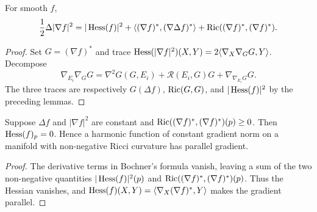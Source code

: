 \begin{lemma}
\label{lem:function-bochner-formula}





For smooth $f$,
$$\frac12\Delta|\nabla f|^2
=|\operatorname{Hess}(f)|^2
+\langle(\nabla f)^*,(\nabla\Delta f)^*\rangle
+\operatorname{Ric}((\nabla f)^*,(\nabla f)^*).$$
\end{lemma}
\begin{proof}
\sketch
{}

Set $G=(\nabla f)^*$ and trace
$\operatorname{Hess}(|\nabla f|^2)(X,Y)=2\langle\nabla_X\nabla_GG,Y\rangle$.
Decompose
$$\nabla_{E_i}\nabla_GG
=\nabla^2G(G,E_i)+\mathcal R(E_i,G)G
+\nabla_{\nabla_{E_i}G}G.$$
The three traces are respectively
$G(\Delta f)$, $\operatorname{Ric}(G,G)$, and $|\operatorname{Hess}(f)|^2$ by the preceding
lemmas.
\end{proof}

\begin{corollary}
\label{cor:bochner-vanishing}





Suppose $\Delta f$ and $|\nabla f|^2$ are constant and
$\operatorname{Ric}((\nabla f)^*,(\nabla f)^*)(p)\ge0$. Then
$\operatorname{Hess}(f)_p=0$. Hence a harmonic function of constant gradient norm on
a manifold with non-negative Ricci curvature has parallel gradient.
\end{corollary}
\begin{proof}
\sketch
{}

The derivative terms in Bochner's formula vanish, leaving a sum of the
two non-negative quantities $|\operatorname{Hess}(f)|^2(p)$ and
$\operatorname{Ric}((\nabla f)^*,(\nabla f)^*)(p)$. Thus the Hessian vanishes, and
$\operatorname{Hess}(f)(X,Y)=\langle\nabla_X(\nabla f)^*,Y\rangle$ makes the gradient
parallel.
\end{proof}

